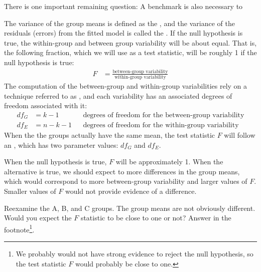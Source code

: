 There is one important remaining question: A benchmark is also necessary to 

The variance of the group means is defined as the , and the variance of the residuals (errors) from the fitted model is called the . If the null hypothesis is true, the within-group and between group variability will be about equal. That is, the following fraction, which we will use as a test statistic, will be roughly 1 if the null hypothesis is true:
\begin{align*}
F &= \frac{\text{between-group variability}}{\text{within-group variability}}
\end{align*}
The computation of the between-group and within-group variabilities rely on a technique referred to as , and each variability has an associated degrees of freedom associated with it:
\begin{align*}
df_{G} &= k-1 &&\text{degrees of freedom for the between-group variability} \\
df_{E} &= n-k-1 &&\text{degrees of freedom for the within-group variability}
\end{align*}
When the the groups actually have the same mean, the test statistic $F$ will follow an , which has two parameter values: $df_{G}$ and $df_{E}$.

When the null hypothesis is true, $F$ will be approximately 1. When the alternative is true, we should expect to more differences in the group means, which would correspond to more between-group variability and larger values of $F$. Smaller values of $F$ would not provide evidence of a difference.

\begin{exercise}
Reexamine the A, B, and C groups. The group means are not obviously different. Would you expect the $F$ statistic to be close to one or not? Answer in the footnote\footnote{We probably would not have strong evidence to reject the null hypothesis, so the test statistic $F$ would probably be close to one.}.
\end{exercise}

